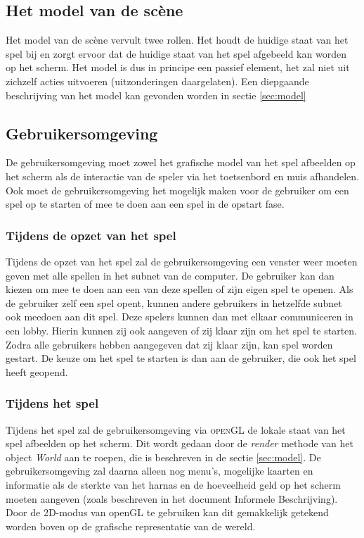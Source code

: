 \documentclass[a4paper,11pt]{article}
\begin{document}
    \subsection{Het model van de sc\`ene}
    Het model van de sc\`ene vervult twee rollen. Het houdt de huidige staat van het spel bij en zorgt ervoor dat de huidige staat van het spel afgebeeld kan worden op het scherm. Het model is dus in principe een passief element, het zal niet uit zichzelf acties uitvoeren (uitzonderingen daargelaten). Een diepgaande beschrijving van het model kan gevonden worden in sectie \ref{sec:model}

    \subsection{Gebruikersomgeving}
   	De gebruikersomgeving moet zowel het grafische model van het spel afbeelden op het scherm als de interactie van de speler via het toetsenbord en muis afhandelen. Ook moet de gebruikersomgeving het mogelijk maken voor de gebruiker om een spel op te starten of mee te doen aan een spel in de opstart fase.

    \subsubsection{Tijdens de opzet van het spel}
    Tijdens de opzet van het spel zal de gebruikersomgeving een venster weer moeten geven met alle spellen in het subnet van de computer. De gebruiker kan dan kiezen om mee te doen aan een van deze spellen of zijn eigen spel te openen. Als de gebruiker zelf een spel opent, kunnen andere gebruikers in hetzelfde subnet ook meedoen aan dit spel. Deze spelers kunnen dan met elkaar communiceren in een lobby. Hierin kunnen zij ook aangeven of zij klaar zijn om het spel te starten. Zodra alle gebruikers hebben aangegeven dat zij klaar zijn, kan spel worden gestart. De keuze om het spel te starten is dan aan de gebruiker, die ook het spel heeft geopend.

    \subsubsection{Tijdens het spel}
    Tijdens het spel zal de gebruikersomgeving via \textsc{openGL} de lokale staat van het spel afbeelden op het scherm. Dit wordt gedaan door de \emph{render} methode van het object \emph{World} aan te roepen, die is beschreven in de sectie \ref{sec:model}. De gebruikersomgeving zal daarna alleen nog menu's, mogelijke kaarten en informatie als de sterkte van het harnas en de hoeveelheid geld op het scherm moeten aangeven (zoals beschreven in het document Informele Beschrijving). Door de 2D-modus van openGL te gebruiken kan dit gemakkelijk getekend worden boven op de grafische representatie van de wereld.
    
\end{document}
